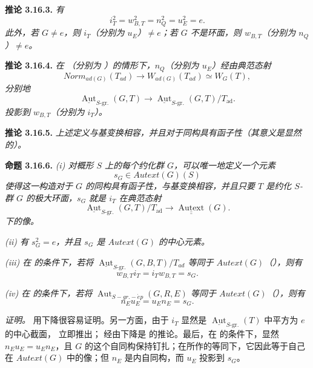 \textbf{推论 3.16.3.} \emph{有}
\[
  i_T^2=w_{B,T}^2=n_Q^2=u_E^2=e.
\]
\emph{此外，若 \(G \neq e\)，则 \(i_{T}\)（分别为 \(u_{E}\)）\(\neq e\)；若 \(G\) 不是环面，则 \(w_{B, T}\)（分别为 \(n_{Q}\)）\(\neq e\)。}

\textbf{推论 3.16.4.} \emph{在 （分别为 ）的情形下，\(n_{Q}\)（分别为 \(u_{E}\)）经由典范态射}
\[ Norm_{ad(G)}(T_{ad}) \to W_{ad(G)}(T_{ad}) \simeq W_{G}(T), \]
\emph{分别地}
\[
  \underline{\operatorname{Aut}}_{S\text{-}\mathrm{gr.}}(G,T)
  \longrightarrow
  \underline{\operatorname{Aut}}_{S\text{-}\mathrm{gr.}}(G,T)/T_{\mathrm{ad}}.
\]
\emph{投影到 \(w_{B, T}\)（分别为 \(i_{T}\)）。}

\textbf{推论 3.16.5.} \emph{上述定义与基变换相容，并且对于同构具有函子性（其意义是显然的）。}

\textbf{命题 3.16.6.} \emph{(i) 对概形 \(S\) 上的每个约化群 \(G\)，可以唯一地定义一个元素}
\[ s_{G} \in Autext(G)(S) \]
\emph{使得这一构造对于 \(G\) 的同构具有函子性，与基变换相容，并且只要 \(T\) 是约化 \(S\)-群 \(G\) 的极大环面，\(s_{G}\) 就是 \(i_{T}\) 在典范态射}
\[
  \underline{\operatorname{Aut}}_{S\text{-}\mathrm{gr.}}(G,T)/T_{\mathrm{ad}}
  \longrightarrow\underline{\underline{\operatorname{Autext}}}(G).
\]
\emph{下的像。}

\emph{(ii) 有 \(s^{2}_{G} = e\)，并且 \(s_{G}\) 是 \(Autext(G)\) 的中心元素。}

\emph{(iii) 在  的条件下，若将 \(\underline{\operatorname{Aut}}_{S\text{-}\mathrm{gr.}}(G, B, T) / T_{ad}\) 等同于 \(Autext(G)\)（），则有}
\[
  w_{B,T}i_T=i_Tw_{B,T}=s_G.
\]

\emph{(iv) 在  的条件下，若将 \(\operatorname{Aut}_{S-gr.-\acute{e}p}(G, R, E)\) 等同于 \(Autext(G)\)（），则有}
\[
  n_Eu_E=u_En_E=s_G.
\]

\emph{证明。}  用下降很容易证明。另一方面，由于 \(i_{T}\) 显然是 \(\underline{\operatorname{Aut}}_{S\text{-}\mathrm{gr.}}(T)\) 中平方为 \(e\) 的中心截面， 立即推出； 经由下降是  的推论。最后，在  的条件下，显然 \(n_{E} u_{E} = u_{E} n_{E}\)，且 \(G\) 的这个自同构保持钉扎；在所作的等同下，它因此等于自己在 \(Autext(G)\) 中的像；但 \(n_{E}\) 是内自同构，而 \(u_{E}\) 投影到 \(s_{G}\)。

